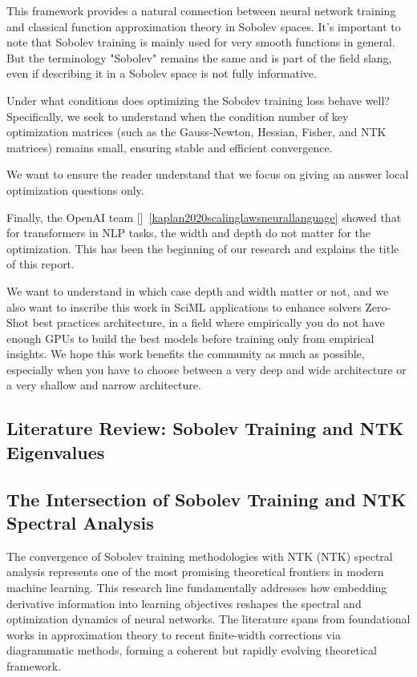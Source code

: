 \documentclass[a4paper]{article}
\theoremstyle{plain}
\theoremstyle{definition}
\theoremstyle{remark}
\begin{document}
This framework provides a natural connection between neural network training and classical function approximation theory in Sobolev spaces.
It's important to note that Sobolev training is mainly used for very smooth functions in general. But the terminology "Sobolev" remains the same
and is part of the field slang, even if describing it in a Sobolev space is not fully informative.

\begin{tcolorbox}[colback=red!5,colframe=red!80!black,title={\textbf{Central Research Question}},enhanced,drop shadow,boxrule=2pt]
Under what conditions does optimizing the Sobolev training loss behave well? Specifically, we seek to understand when the condition number of key optimization matrices (such as the Gauss-Newton, Hessian, Fisher, and NTK matrices) remains small, ensuring stable and efficient convergence.
\end{tcolorbox}

We want to ensure the reader understand that we focus on giving an answer local optimization questions only.

Finally, the OpenAI team []~\ref{kaplan2020scalinglawsneurallanguage} showed that for transformers in NLP tasks, the width and depth do not matter for the optimization. This has been the beginning
of our research and explains the title of this report. 

We want to understand in which case depth and width matter or not, and we also want to inscribe this work 
in SciML applications to enhance solvers Zero-Shot best practices architecture, in a field where empirically you do not have enough
GPUs to build the best models before training only from empirical insights. We hope this work benefits the community as much as possible, especially
when you have to choose between a very deep and wide architecture or a very shallow and narrow architecture.

\subsection{Literature Review: Sobolev Training and NTK Eigenvalues}

\subsection{The Intersection of Sobolev Training and NTK Spectral Analysis}

The convergence of Sobolev training methodologies with NTK (NTK) spectral analysis represents one of the most promising theoretical frontiers in modern machine learning. This research line fundamentally addresses how embedding derivative information into learning objectives reshapes the spectral and optimization dynamics of neural networks. The literature spans from foundational works in approximation theory to recent finite-width corrections via diagrammatic methods, forming a coherent but rapidly evolving theoretical framework.
\end{document}
